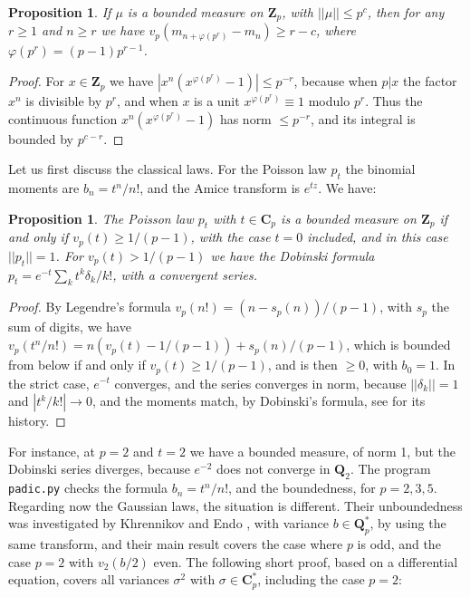 \documentclass[11pt]{amsart}
\newtheorem{proposition}[theorem]{Proposition}
\theoremstyle{definition}
\begin{document}
\begin{proposition}
\label{p72}
If $\mu$ is a bounded measure on $\mathbf Z_p$, with $||\mu||\leq p^c$, then for any $r\geq1$ and $n\geq r$ we have $v_p(m_{n+\varphi(p^r)}-m_n)\geq r-c$, where $\varphi(p^r)=(p-1)p^{r-1}$.
\end{proposition}

\begin{proof}
For $x\in\mathbf Z_p$ we have $|x^n(x^{\varphi(p^r)}-1)|\leq p^{-r}$, because when $p|x$ the factor $x^n$ is divisible by $p^r$, and when $x$ is a unit $x^{\varphi(p^r)}\equiv1$ modulo $p^r$. Thus the continuous function $x^n(x^{\varphi(p^r)}-1)$ has norm $\leq p^{-r}$, and its integral is bounded by $p^{c-r}$.
\end{proof}

Let us first discuss the classical laws. For the Poisson law $p_t$ the binomial moments are $b_n=t^n/n!$, and the Amice transform is $e^{tz}$. We have:

\begin{proposition}
\label{p73}
The Poisson law $p_t$ with $t\in\mathbf C_p$ is a bounded measure on $\mathbf Z_p$ if and only if $v_p(t)\geq1/(p-1)$, with the case $t=0$ included, and in this case $||p_t||=1$. For $v_p(t)>1/(p-1)$ we have the Dobinski formula $p_t=e^{-t}\sum_kt^k\delta_k/k!$, with a convergent series.
\end{proposition}

\begin{proof}
By Legendre's formula $v_p(n!)=(n-s_p(n))/(p-1)$, with $s_p$ the sum of digits, we have $v_p(t^n/n!)=n(v_p(t)-1/(p-1))+s_p(n)/(p-1)$, which is bounded from below if and only if $v_p(t)\geq1/(p-1)$, and is then $\geq0$, with $b_0=1$. In the strict case, $e^{-t}$ converges, and the series converges in norm, because $||\delta_k||=1$ and $|t^k/k!|\to0$, and the moments match, by Dobinski's formula, see \cite{dfg} for its history.
\end{proof}

For instance, at $p=2$ and $t=2$ we have a bounded measure, of norm 1, but the Dobinski series diverges, because $e^{-2}$ does not converge in $\mathbf Q_2$. The program {\tt padic.py} checks the formula $b_n=t^n/n!$, and the boundedness, for $p=2,3,5$. Regarding now the Gaussian laws, the situation is different. Their unboundedness was investigated by Khrennikov and Endo \cite{ken}, with variance $b\in\mathbf Q_p^*$, by using the same transform, and their main result covers the case where $p$ is odd, and the case $p=2$ with $v_2(b/2)$ even. The following short proof, based on a differential equation, covers all variances $\sigma^2$ with $\sigma\in\mathbf C_p^*$, including the case $p=2$:
\end{document}
